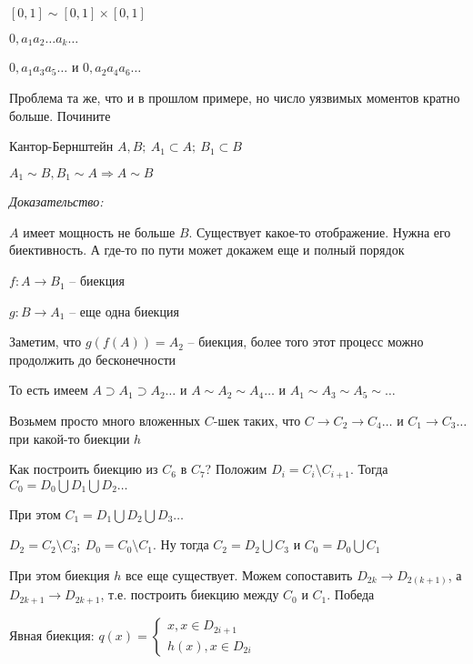 \documentclass[12pt]{article}
\begin{document}
\begin{Example}{}
    $[0, 1] \sim [0, 1] \times [0, 1]$

    $0, a_1a_2 \ldots a_k \ldots$

    $0, a_1a_3a_5 \ldots$ и $0, a_2a_4a_6 \ldots$

    \begin{Exercise}{}
        Проблема та же, что и в прошлом примере, но число уязвимых моментов кратно больше. Почините
    \end{Exercise}
\end{Example}

\begin{theo}{Кантор-Бернштейн}
    $A, B;\ A_1 \subset A;\ B_1 \subset B$

    $A_1 \sim B, B_1 \sim A \Rightarrow A \sim B$
\end{theo}

\textit{Доказательство:}

$A$ имеет мощность не больше $B$. Существует какое-то отображение. Нужна его биективность. А где-то по пути может докажем еще и полный порядок

$f: A \rightarrow B_1$ -- биекция

$g : B \rightarrow A_1$ -- еще одна биекция

Заметим, что $g(f(A)) = A_2$ -- биекция, более того этот процесс можно продолжить до бесконечности 

То есть имеем $A \supset A_1 \supset A_2 \ldots$ и $A \sim A_2 \sim A_4 \ldots$ и $A_1 \sim A_3 \sim A_5 \sim \ldots$

Возьмем просто много вложенных $C$-шек таких, что $C \rightarrow C_2 \rightarrow C_4 \ldots$ и $C_1 \rightarrow C_3 \ldots$ при какой-то биекции $h$

Как построить биекцию из $C_6$ в $C_7$? Положим $D_i = C_i \setminus C_{i + 1}$. Тогда $C_0 = D_0 \bigcup D_1 \bigcup D_2 \ldots$

При этом $C_1 = D_1 \bigcup D_2 \bigcup D_3 \ldots$

$D_2 = C_2 \setminus C_3;\ D_0 = C_0 \setminus C_1$. Ну тогда $C_2 = D_2 \bigcup C_3$ и $C_0 = D_0 \bigcup C_1$

При этом биекция $h$ все еще существует. Можем сопоставить $D_{2k} \rightarrow D_{2(k + 1)}$, а $D_{2k + 1} \rightarrow D_{2k + 1}$, т.е. построить биекцию между $C_0$ и $C_1$. Победа

Явная биекция: $q(x) = \begin{cases}
    x, x \in D_{2i + 1} \\
    h(x), x \in D_{2i}
\end{cases}$
\end{document}
